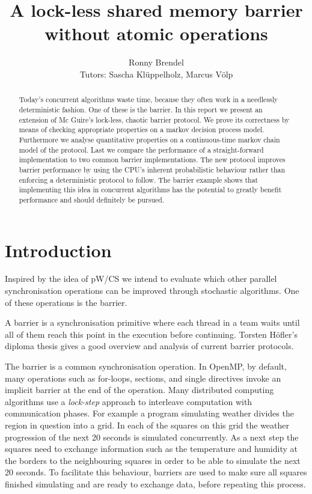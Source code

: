 \documentclass[a4paper, 10pt]{article}
\title{A lock-less shared memory barrier without atomic operations}
\author{Ronny Brendel\\Tutors: Sascha Kl\"uppelholz, Marcus V\"olp}
\begin{document}
\maketitle

\begin{abstract}
Today's concurrent algorithms waste time, because they often work in a needlessly deterministic fashion. One of these is the barrier. In this report we present an extension of Mc Guire's lock-less, chaotic barrier protocol. We prove its correctness by means of checking appropriate properties on a markov decision process model. Furthermore we analyse quantitative properties on a continuous-time markov chain model of the protocol. Last we compare the performance of a straight-forward implementation to two common barrier implementations. The new protocol improves barrier performance by using the CPU's inherent probabilistic behaviour rather than enforcing a deterministic protocol to follow. The barrier example shows that implementing this idea in concurrent algorithms has the potential to greatly benefit performance and should definitely be pursued.
\end{abstract}

\section{Introduction}
Inspired by the idea of pW/CS\cite{pwcs} we intend to evaluate which other parallel synchronisation operations can be improved through stochastic algorithms. One of these operations is the barrier.

A barrier is a synchronisation primitive where each thread in a team waits until all of them reach this point in the execution before continuing. Torsten H\"ofler's diploma thesis\cite{hoefler2005} gives a good overview and analysis of current barrier protocols.

The barrier is a common synchronisation operation. In OpenMP\cite{omp}, by default, many operations such as for-loops, sections, and single directives invoke an implicit barrier at the end of the operation. Many distributed computing algorithms use a \emph{lock-step} approach to interleave computation with communication phases. For example a program simulating weather divides the region in question into a grid. In each of the squares on this grid the weather progression of the next 20 seconds is simulated concurrently. As a next step the squares need to exchange information such as the temperature and humidity at the borders to the neighbouring squares in order to be able to simulate the next 20 seconds. To facilitate this behaviour, barriers are used to make sure all squares finished simulating and are ready to exchange data, before repeating this process.
\end{document}
